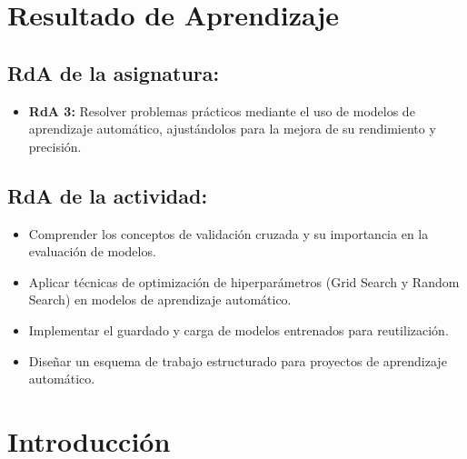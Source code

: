 \documentclass[a4,11pt]{aleph-notas}
\begin{document}
\encabezado


\section*{Resultado de Aprendizaje}

\subsection*{RdA de la asignatura:}
\begin{itemize}[leftmargin=*]
    \item \textbf{RdA 3:} Resolver problemas prácticos mediante el uso de modelos de aprendizaje automático, ajustándolos para la mejora de su rendimiento y precisión.
\end{itemize}

\subsection*{RdA de la actividad:}
\begin{itemize}[leftmargin=*]
    \item Comprender los conceptos de validación cruzada y su importancia en la evaluación de modelos.
    \item Aplicar técnicas de optimización de hiperparámetros (Grid Search y Random Search) en modelos de aprendizaje automático.
    \item Implementar el guardado y carga de modelos entrenados para reutilización.
    \item Diseñar un esquema de trabajo estructurado para proyectos de aprendizaje automático.
\end{itemize}

\section*{Introducción}
\end{document}
